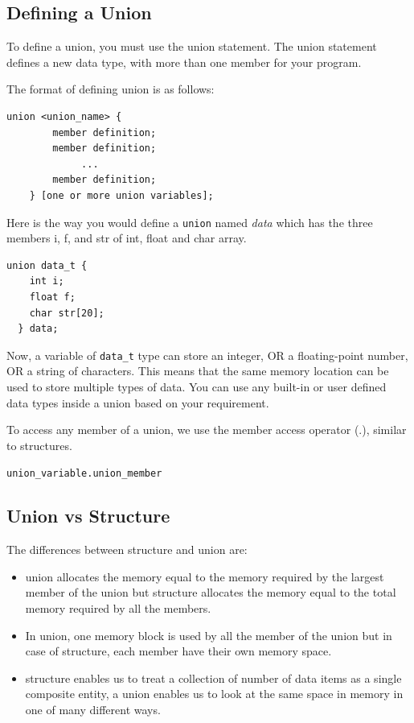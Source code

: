 \documentclass[11pt,a4paper]{article}
\begin{document}
\subsection*{Defining a Union}
To define a union, you must use the union statement. The union statement defines a new data type, with more than one member for your program.

The format of defining union  is as follows:
\begin{lstlisting}[numbers=none]
    union <union_name> {
        member definition;
        member definition;
             ...
        member definition;
    } [one or more union variables];
\end{lstlisting}

Here is the way you would define a \lstinline!union! named \emph{data} which has the three members i, f, and str of int, float and char array.
\begin{lstlisting}[numbers=none]
  union data_t {
    int i;
    float f;
    char str[20];
  } data; 
\end{lstlisting}

Now, a variable of \lstinline!data_t! type can store an integer, OR a floating-point number, OR a string of characters. This means that the same memory location can be used to store multiple types of data. You can use any built-in or user defined data types inside a union based on your requirement.

To access any member of a union, we use the member access operator (.), similar to structures. 

\texttt{union\_variable.union\_member}

\subsection*{Union vs Structure}
The differences between structure and union are: 
\begin{itemize}
\item union allocates the memory equal to the memory required by the largest member of the union but structure allocates the memory equal to the total memory required by all the members. 
\item In union, one memory block is used by all the member of the union but in case of structure, each member have their own memory space.
\item structure enables us to treat a collection of number of data items as a single composite entity, a union enables us to look at the same space in memory in one of many different ways.
\end{itemize}
\end{document}
